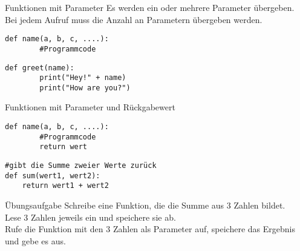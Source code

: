 \begin{frame}[fragile]{Funktionen mit Parameter}
Es werden ein oder mehrere Parameter übergeben. \\
Bei jedem Aufruf muss die Anzahl an Parametern übergeben werden.
\begin{lstlisting}
def name(a, b, c, ....):
		#Programmcode
\end{lstlisting}

\begin{lstlisting}
def greet(name):
		print("Hey!" + name)
		print("How are you?")
\end{lstlisting}
\end{frame}


\begin{frame}[fragile]{Funktionen mit Parameter und Rückgabewert}

\begin{lstlisting}
def name(a, b, c, ....):
		#Programmcode
		return wert
\end{lstlisting}

\begin{lstlisting}
#gibt die Summe zweier Werte zurück
def sum(wert1, wert2):
	return wert1 + wert2	
\end{lstlisting}
\end{frame}

\begin{frame}[fragile]{Übungsaufgabe}
Schreibe eine Funktion, die die Summe aus 3 Zahlen bildet.\\
Lese 3 Zahlen jeweils ein und speichere sie ab.\\
Rufe die Funktion mit den 3 Zahlen als Parameter auf, speichere das Ergebnis und gebe es aus.

\end{frame}





